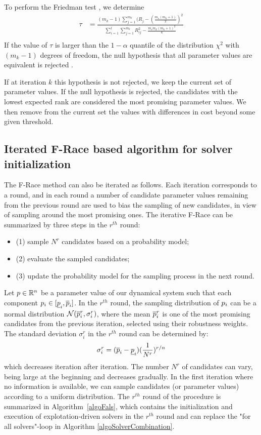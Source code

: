 To perform the Friedman test \cite{FRace2010}, we determine
\begin{eqnarray*}
\tau & = \displaystyle{ \frac{ (m_k-1) \sum_{j=1}^{m_k} (R_j - (\frac{m_s(m_k+1)}{2})^2 } {\sum_{i=1}^l \sum_{j=1}^{m_k}  R^2_{ij} -  \frac{m_s m_k (m_k+1)^2}{4} }} \nonumber \\ 
\end{eqnarray*}
If the value of $\tau$ is larger than the $1 - \alpha$ quantile of the distribution $\chi^2$  with $(m_k - 1)$ degrees of freedom, the null hypothesis that all parameter values are equivalent is rejected \cite{Papoulis1991}. 

If at iteration $k$ this hypothesis is not rejected, we keep the current set of parameter values. If the null hypothesis is rejected, the candidates with the lowest expected rank are considered the most promising parameter values. We then remove from the current set  the values with differences in cost beyond some given threshold.  
 
 \subsection{Iterated F-Race based algorithm for solver initialization}
The F-Race method can also be iterated as follows. Each iteration corresponds to a round, and in each round a number of candidate parameter values remaining from the previous round are used to bias the sampling of new candidates, in view of sampling around the most promising ones. The iterative F-Race can be summarized by three steps in the $r^{th}$ round: 
\begin{itemize}
\item (1) sample $N^r$ candidates based on a probability model; 
\item (2) evaluate the sampled candidates; 
\item (3) update the probability model for the sampling process in the next round.
\end{itemize}
Let $p \in \mathbb{R}^n$ be a parameter value of our dynamical system such that each component $p_i \in [\underline{p}_i, \overline{p}_i]$. In the $r^{th}$ round, the sampling distribution of $p_i$ can be a normal distribution $\mathcal{N}(\overline{p}^r_i, \sigma_i^r)$, where the mean $\overline{p}^r_i$ is one of the most promising candidates from the previous iteration, selected using their robustness weights. The standard deviation $\sigma_i^r$ in the $r^{th}$ round can be determined by: 
\begin{equation} \label{eq:sigma}
\sigma_i^r = (\overline{p}_i - \underline{p}_i) (\frac{1}{N^r})^{r/n}
\end{equation}
which decreases iteration after iteration. The number $N^r$ of candidates can vary, being large at the beginning and decreases gradually. In the first iteration where no information is available, we can sample candidates (or parameter values) according to a uniform distribution. The $r^{th}$ round of the procedure is summarized in Algorithm~\ref{algoFals}, which contains the initialization and execution of explotation-driven solvers in the $r^{th} $ round and can replace the "for all solvers"-loop in Algorithm \ref{algoSolverCombination}. 

